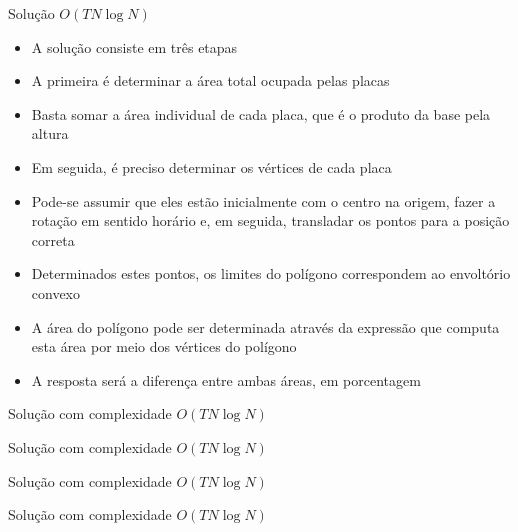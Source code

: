 \begin{frame}[fragile]{Solução $O(TN\log N)$}

    \begin{itemize}
        \item A solução consiste em três etapas

        \item A primeira é determinar a área total ocupada pelas placas

        \item Basta somar a área individual de cada placa, que é o produto da base pela altura

        \item Em seguida, é preciso determinar os vértices de cada placa

        \item Pode-se assumir que eles estão inicialmente com o centro na origem, fazer a 
            rotação em sentido horário e, em seguida, transladar os pontos para a posição
            correta

        \item Determinados estes pontos, os limites do polígono correspondem ao envoltório
            convexo

        \item A área do polígono pode ser determinada através da expressão que computa esta
            área por meio dos vértices do polígono

        \item A resposta será a diferença entre ambas áreas, em porcentagem
    \end{itemize}

\end{frame}

\begin{frame}[fragile]{Solução com complexidade $O(TN\log N)$}
\end{frame}

\begin{frame}[fragile]{Solução com complexidade $O(TN\log N)$}
\end{frame}

\begin{frame}[fragile]{Solução com complexidade $O(TN\log N)$}
\end{frame}

\begin{frame}[fragile]{Solução com complexidade $O(TN\log N)$}
\end{frame}

